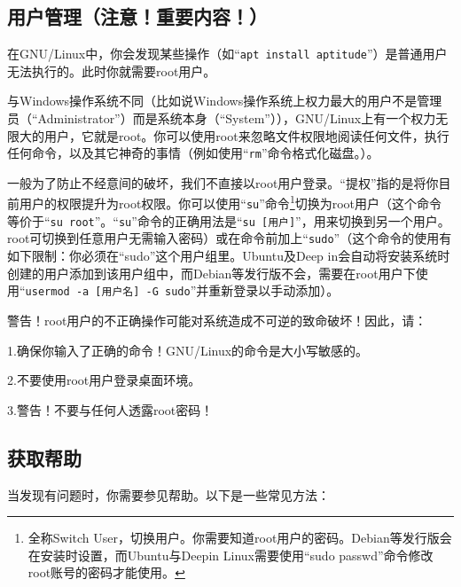 \subsection{用户管理（注意！重要内容！）}
\cite{DebianRef}\par
在GNU/Linux中，你会发现某些操作（如“\verb|apt install aptitude|”）是普通用户无法执行的。此时你就需要root用户。\par
与Windows操作系统不同（比如说Windows操作系统上权力最大的用户不是管理员（“Administrator”）而是系统本身（“System”）），GNU/Linux上有一个权力无限大的用户，它就是root。你可以使用root来忽略文件权限地阅读任何文件，执行任何命令，以及其它神奇的事情（例如使用“\verb|rm|”命令格式化磁盘。）。\par
一般为了防止不经意间的破坏，我们不直接以root用户登录。“提权”指的是将你目前用户的权限提升为root权限。你可以使用“\verb|su|”命令\footnote{全称Switch User，切换用户。你需要知道root用户的密码。Debian等发行版会在安装时设置，而Ubuntu与Deepin Linux需要使用“sudo passwd”命令修改root账号的密码才能使用。}切换为root用户（这个命令等价于“\verb|su root|”。“\verb|su|”命令的正确用法是“\verb|su [用户]|”，用来切换到另一个用户。root可切换到任意用户无需输入密码）或在命令前加上“\verb|sudo|”（这个命令的使用有如下限制：你必须在“sudo”这个用户组里。Ubuntu及Deep in会自动将安装系统时创建的用户添加到该用户组中，而Debian等发行版不会，需要在root用户下使用“\verb|usermod -a [用户名] -G sudo|”并重新登录以手动添加）。\par
{\color{red}警告！root用户的不正确操作可能对系统造成不可逆的致命破坏！因此，请：\par
	1.确保你输入了正确的命令！GNU/Linux的命令是大小写敏感的。\par
	2.不要使用root用户登录桌面环境。\par
	3.警告！不要与任何人透露root密码！}\par
\subsection{获取帮助}
\cite{manman}\par
当发现有问题时，你需要参见帮助。以下是一些常见方法：\par
